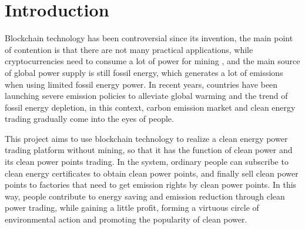 



\chapter{Introduction} \label{Chapter:Introduction}
Blockchain technology has been controversial since its invention, the main point of contention is that there are not many practical applications, while cryptocurrencies need to consume a lot of power for mining \cite{disadvantagecrypto}, and the main source of global power supply is still fossil energy, which generates a lot of emissions when using limited fossil energy power\cite{QI2020115049}. In recent years, countries have been launching severe emission policies to alleviate global warming and the trend of fossil energy depletion, in this context, carbon emission market and clean energy trading gradually come into the eyes of people.

This project aims to use blockchain technology to realize a clean energy power trading platform without mining, so that it has the function of clean power and its clean power points trading. In the system, ordinary people can subscribe to clean energy certificates to obtain clean power points, and finally sell clean power points to factories that need to get emission rights by clean power points. In this way, people contribute to energy saving and emission reduction through clean power trading, while gaining a little profit, forming a virtuous circle of environmental action and promoting the popularity of clean power.

